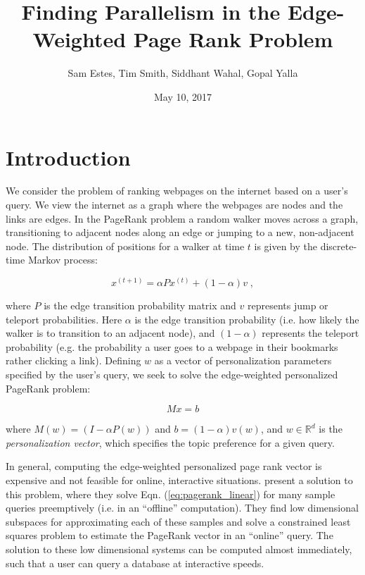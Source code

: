 \documentclass[11pt]{article}
\title{Finding Parallelism in the Edge-Weighted Page Rank Problem}
\author{Sam Estes, Tim Smith, Siddhant Wahal, Gopal Yalla}
\date{May 10, 2017}
\newcommand{\noi}{\noindent}
\begin{document}
\maketitle
\thispagestyle{empty}

\newpage
\thispagestyle{empty}
\tableofcontents
\newpage
\setcounter{page}{1}


\section{Introduction}

We consider the problem of ranking webpages on the internet based on a user's
query. We view the internet as a graph where the webpages are nodes and the
links are edges. 
In the PageRank problem a random walker moves across a graph, transitioning to
adjacent nodes along an edge or jumping to a new, non-adjacent node. The
distribution of positions for a walker at time $t$ is given by the discrete-time
Markov process: 

\begin{equation}
        x^{(t+1)}=\alpha P x^{(t)} + (1-\alpha) v \; ,
\label{eq:pagerank_markov}
\end{equation}

\noi where $P$ is the edge transition probability matrix and $v$ represents jump or
teleport probabilities. Here $\alpha$ is the edge
transition probability (i.e. how likely the walker is to transition to an
adjacent node), and $(1-\alpha)$ represents the teleport probability (e.g. the
probability a user goes to a webpage in their bookmarks rather clicking a link).
Defining $w$ as a vector of personalization parameters specified by the user's
query, we seek to solve the
edge-weighted personalized PageRank problem: 

\begin{equation}
        Mx=b
\label{eq:pagerank_linear}
\end{equation}

\noi where $M(w) = (I-\alpha P(w))$ and $b = (1-\alpha)v(w)$, and $w \in
\mathbb{R}^d$ is
the \textit{personalization vector}, which specifies the topic preference for
a given query. 

In general, computing the edge-weighted personalized page rank vector is expensive
and not feasible for online, interactive situations. \cite{xie} present a
solution to this problem, where they solve Eqn. (\ref{eq:pagerank_linear}) for many
sample queries preemptively (i.e. in an ``offline'' computation). They find low
dimensional subspaces for
approximating each of these samples and solve a constrained least squares
problem to estimate the PageRank vector in an ``online'' query. The solution to
these low dimensional systems can be computed almost immediately, such that
a user can query a database at interactive speeds.   
\end{document}
